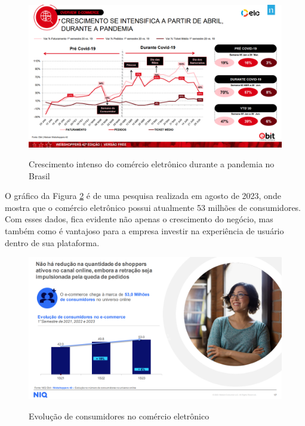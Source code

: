 \begin{figure}[h]
    \centering
    \caption{Crescimento intenso do comércio eletrônico durante a pandemia no Brasil}
    \includegraphics[keepaspectratio=true,scale=0.3]{figuras/edicao42a.png}
    \label{fig02}
\end{figure}

O gráfico da Figura \ref{fig03} é de uma pesquisa realizada em agosto de 2023, onde mostra que o comércio eletrônico possui atualmente 53 milhões de consumidores. Com esses dados, fica evidente não apenas o crescimento do negócio, mas também como é vantajoso para a empresa investir na experiência de usuário dentro de sua plataforma.

\begin{figure}[h]
    \centering
    \caption{Evolução de consumidores no comércio eletrônico}
    \includegraphics[keepaspectratio=true,scale=0.3]{figuras/edicao48.png}
    \label{fig03}
\end{figure}



